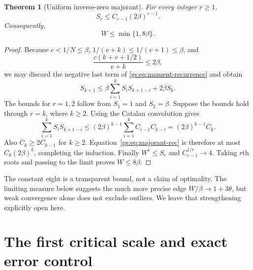 \documentclass[11pt,a4paper]{article}
\numberwithin{equation}{section}
\newtheorem{theorem}{Theorem}[section]
\theoremstyle{definition}
\theoremstyle{remark}
\begin{document}
\begin{theorem}[Uniform inverse-zero majorant]\label{gs:thm:majorant}
For every integer $r\ge1$,
\begin{equation}\label{gs:eq:catalan-majorant}
 S_r\le C_{r-1}(2\beta)^{r-1}.
\end{equation}
Consequently,
\begin{equation}\label{gs:eq:Wbound}
 \boxed{\quad W\le\min\{1,8\beta\}.\quad}
\end{equation}
\end{theorem}
\begin{proof}
Because $c<1/N\le\beta$, $1/(v+k)\le1/(v+1)\le\beta$, and
\[
 \frac{c(k+v+1/2)}{v+k}\le2\beta,
\]
we may discard the negative last term of
\eqref{gs:eq:moment-recurrence} and obtain
\begin{equation}\label{gs:eq:majorant-rec}
 S_{k+1}\le\beta\sum_{i=1}^kS_iS_{k+1-i}+2\beta S_k.
\end{equation}
The bounds for $r=1,2$ follow from $S_1=1$ and $S_2=\beta$.
Suppose the bounds hold through $r=k$, where $k\ge2$.
Using the Catalan convolution gives
\[
 \sum_{i=1}^kS_iS_{k+1-i}
 \le(2\beta)^{k-1}\sum_{i=1}^k C_{i-1}C_{k-i}
 =(2\beta)^{k-1}C_k.
\]
Also $C_k\ge2C_{k-1}$ for $k\ge2$. Equation~\eqref{gs:eq:majorant-rec}
is therefore at most $C_k(2\beta)^k$, completing the induction.
Finally $W^r\le S_r$ and $C_{r-1}^{1/r}\to4$. Taking $r$th roots
and passing to the limit proves $W\le8\beta$.
\end{proof}

The constant eight is a transparent bound, not a claim of optimality.
The limiting measure below suggests the much more precise edge
$W/\beta\to1+3\theta$, but weak convergence alone does not exclude
outliers. We leave that strengthening explicitly open here.

\section{The first critical scale and exact error control}
\label{gs:sec:gaussian}
\end{document}
